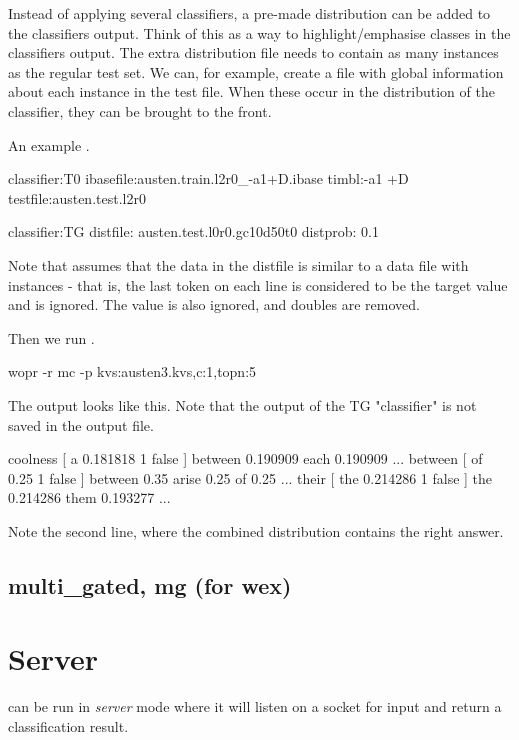 \documentclass[a4paper,10pt,twoside]{report}
\begin{document}
Instead of applying several classifiers, a pre-made distribution can
be added to the classifiers output. Think of this as a way to
highlight/emphasise classes in the classifiers output. The extra
distribution file needs to contain as many instances as the regular
test set. We can, for example, create a file with global information
about each instance in the test file. When these occur in the
distribution of the classifier, they can be brought to the front.

An example .

\begin{wout}{}%
classifier:T0
ibasefile:austen.train.l2r0_-a1+D.ibase
timbl:-a1 +D
testfile:austen.test.l2r0

classifier:TG
distfile: austen.test.l0r0.gc10d50t0
distprob: 0.1
\end{wout}

Note that \wopr{} assumes that the data in the distfile is similar to a
data file with instances - that is, the last token on each line is
considered to be the target value and is ignored. The \cmp{\_} value is also
ignored, and doubles are removed.

Then we run \wopr{}.

\begin{bash}{}
wopr -r mc -p kvs:austen3.kvs,c:1,topn:5
\end{bash}

The output looks like this. Note that the output of the TG
"classifier" is not saved in the output file.

\begin{wout}{}
coolness [ a 0.181818 1 false ] { between 0.190909 each 0.190909 ... }
between [ of 0.25 1 false ] { between 0.35 arise 0.25 of 0.25 ... }
their [ the 0.214286 1 false ] { the 0.214286 them 0.193277 ... }
\end{wout}

Note the second line, where the combined distribution contains the
right answer.

\subsection{multi\_gated, mg (for wex)} %

\section{Server}

\Wopr{} can be run in \emph{server} mode where it will listen on a socket
for input and return a classification result.
\end{document}
